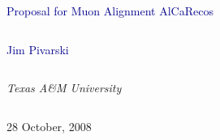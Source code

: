 \documentclass[compress]{beamer}
\begin{document}
\begin{frame}
\vfill
\begin{center}
\textcolor{darkblue}{\Large Proposal for Muon Alignment AlCaRecos}

\vfill
\begin{columns}
\begin{center}
\large
\textcolor{darkblue}{Jim Pivarski}
\end{center}
\end{columns}

\begin{columns}
\begin{center}
\scriptsize
{\it Texas A\&M University}
\end{center}
\end{columns}

\vfill
28 October, 2008

\end{center}
\end{frame}


\small
\end{document}
